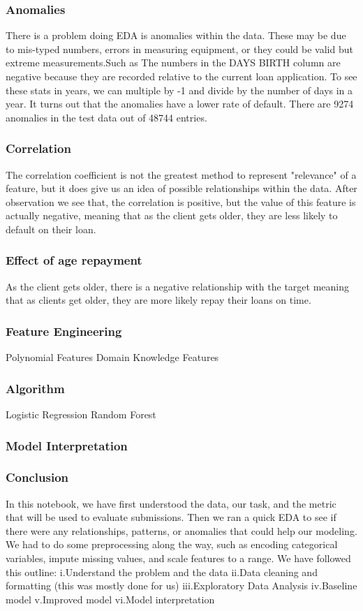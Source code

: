 \documentclass[twoside,a4paper]{article}
\begin{document}
\subsubsection{Anomalies}
There is a problem doing EDA is anomalies within the data. These may be due to mis-typed numbers, errors in measuring equipment, or they could be valid but extreme measurements.Such as The numbers in the DAYS BIRTH column are negative because they are recorded relative to the current loan application. To see these stats in years, we can multiple by -1 and divide by the number of days in a year.
It turns out that the anomalies have a lower rate of default. There are 9274 anomalies in the test data out of 48744 entries.
\subsubsection{Correlation}
The correlation coefficient is not the greatest method to represent "relevance" of a feature, but it does give us an idea of possible relationships within the data. After observation we see that, the correlation is positive, but the value of this feature is actually negative, meaning that as the client gets older, they are less likely to default on their loan.
\subsubsection{Effect of age repayment}
As the client gets older, there is a negative relationship with the target meaning that as clients get older, they are more likely repay their loans on time.
\subsubsection{Feature Engineering}
Polynomial Features
Domain Knowledge Features
\subsubsection{Algorithm}
Logistic Regression
Random Forest
\subsubsection{Model Interpretation}
\subsubsection{Conclusion}
In this notebook, we have first understood the data, our task, and the metric that will be used to evaluate submissions. Then we ran a quick EDA to see if there were any relationships, patterns, or anomalies that could help our modeling. We had to do some preprocessing along the way, such as encoding categorical variables, impute missing values, and scale features to a range. We have followed this outline:
i.Understand the problem and the data
ii.Data cleaning and formatting (this was mostly done for us)
iii.Exploratory Data Analysis
iv.Baseline model
v.Improved model
vi.Model interpretation
\end{document}
